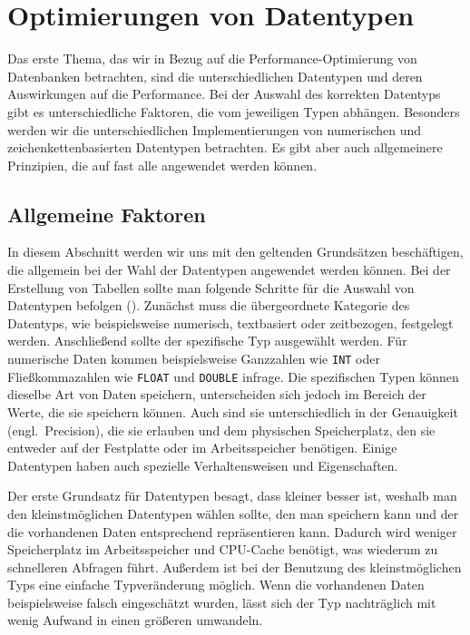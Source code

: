 
\chapter{Optimierungen von Datentypen}\label{ch:data-types}

Das erste Thema, das wir in Bezug auf die Performance-Optimierung von Datenbanken betrachten, sind die unterschiedlichen Datentypen und deren Auswirkungen auf die Performance.
Bei der Auswahl des korrekten Datentyps gibt es unterschiedliche Faktoren, die vom jeweiligen Typen abhängen.
Besonders werden wir die unterschiedlichen Implementierungen von numerischen und zeichenkettenbasierten Datentypen betrachten.
Es gibt aber auch allgemeinere Prinzipien, die auf fast alle angewendet werden können.

\section{Allgemeine Faktoren}\label{sec:data-types-allgemeine-faktoren}

In diesem Abschnitt werden wir uns mit den geltenden Grundsätzen beschäftigen, die allgemein bei der Wahl der Datentypen angewendet werden können.
Bei der Erstellung von Tabellen sollte man folgende Schritte für die Auswahl von Datentypen befolgen (\cite[pp. 115--145]{schwartz2012high}).
Zunächst muss die übergeordnete Kategorie des Datentyps, wie beispielsweise numerisch, textbasiert oder zeitbezogen, festgelegt werden.
Anschließend sollte der spezifische Typ ausgewählt werden.
Für numerische Daten kommen beispielsweise Ganzzahlen wie \texttt{INT} oder Fließkommazahlen wie \texttt{FLOAT} und \texttt{DOUBLE} infrage.
Die spezifischen Typen können dieselbe Art von Daten speichern, unterscheiden sich jedoch im Bereich der Werte, die sie speichern können.
Auch sind sie unterschiedlich in der Genauigkeit (engl.\ Precision), die sie erlauben und dem physischen Speicherplatz, den sie entweder auf der Festplatte oder im Arbeitsspeicher benötigen.
Einige Datentypen haben auch spezielle Verhaltensweisen und Eigenschaften.

Der erste Grundsatz für Datentypen besagt, dass kleiner besser ist, weshalb man den kleinstmöglichen Datentypen wählen sollte, den man speichern kann und der die vorhandenen Daten entsprechend repräsentieren kann.
Dadurch wird weniger Speicherplatz im Arbeitsspeicher und CPU-Cache benötigt, was wiederum zu schnelleren Abfragen führt.
Außerdem ist bei der Benutzung des kleinstmöglichen Typs eine einfache Typveränderung möglich.
Wenn die vorhandenen Daten beispielsweise falsch eingeschätzt wurden, lässt sich der Typ nachträglich mit wenig Aufwand in einen größeren umwandeln.

